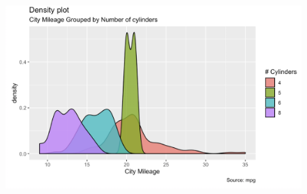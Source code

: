 \documentclass[]{book}
\begin{document}
\begin{figure}[htbp]
\centering
\includegraphics{practice3.png}
\caption{}
\end{figure}


\end{document}
